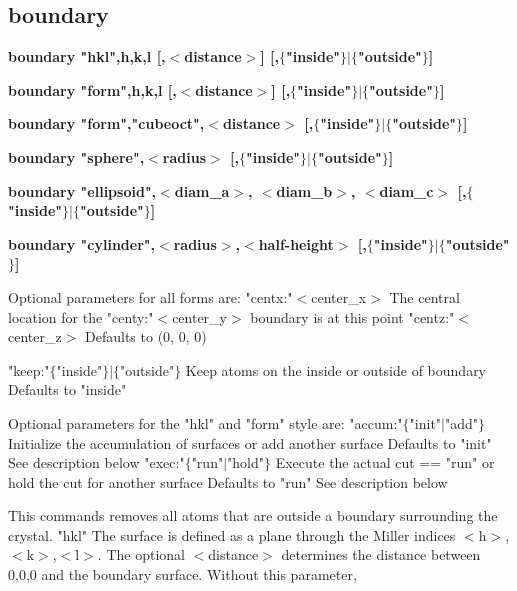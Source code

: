 \subsection*{boundary}
{\bf boundary "hkl",h,k,l [,$ <$distance$> $] [,$ \{$"inside"$\} $$| $$ \{$"outside"$\} $] \par }
{\bf boundary "form",h,k,l [,$ <$distance$> $] [,$ \{$"inside"$\} $$| $$ \{$"outside"$\} $] \par }
{\bf boundary "form","cubeoct",$ <$distance$> $ [,$ \{$"inside"$\} $$| $$ \{$"outside"$\} $] \par }
{\bf boundary "sphere",$ <$radius$> $ [,$ \{$"inside"$\} $$| $$ \{$"outside"$\} $] \par }
{\bf boundary "ellipsoid",$ <$diam\_a$> $, $ <$diam\_b$> $, $ <$diam\_c$> $ [,$ \{$"inside"$\} $$| $$ \{$"outside"$\} $] \par }
{\bf boundary "cylinder",$ <$radius$> $,$ <$half-height$> $ [,$ \{$"inside"$\} $$| $$ \{$"outside"$\} $] \par }
\vspace{3pt}
         Optional parameters for all forms are: 
         "centx:"$ <$center\_x$> $   The central location for the 
         "centy:"$ <$center\_y$> $   boundary is at this point 
         "centz:"$ <$center\_z$> $   Defaults to (0, 0, 0) 
\par
         "keep:"$ \{$"inside"$\} $$| $$ \{$"outside"$\} $  Keep atoms on the inside or 
                                        outside of boundary 
                                        Defaults to "inside" 
\par
         Optional parameters for the "hkl" and "form" style are: 
         "accum:"$ \{$"init"$| $"add"$\} $  Initialize the accumulation of 
                                 surfaces or add another surface 
                                 Defaults to "init" 
                                 See description below 
         "exec:"$ \{$"run"$| $"hold"$\} $   Execute the actual cut == "run" 
                                 or hold the cut for another 
                                 surface 
                                 Defaults to "run" 
                                 See description below 
\par
This commands removes all atoms that are outside a boundary surrounding 
the crystal. 
"hkl"  The surface is defined as a plane through the Miller indices 
       $ <$h$> $,$ <$k$> $,$ <$l$> $. The optional $ <$distance$> $ determines the distance 
       between 0,0,0 and the boundary surface. Without this parameter, 
